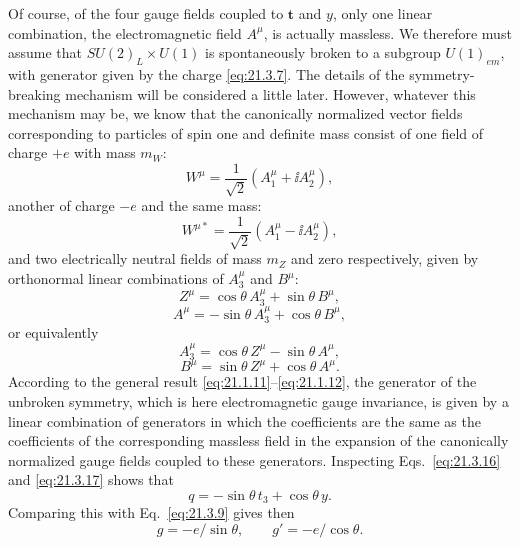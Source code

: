 Of course, of the four gauge fields coupled to $\mathbf{t}$ and $y$, only one linear combination, the electromagnetic field $A^\mu$, is actually massless. We therefore must assume that $SU(2)_L\times U(1)$ is spontaneously broken to a subgroup $U(1)_{em}$, with generator given by the charge \eqref{eq:21.3.7}. The details of the symmetry-breaking mechanism will be considered a little later. However, whatever this mechanism may be, we know that the canonically normalized vector fields corresponding to particles of spin one and definite mass consist of one field of charge $+e$ with mass $m_W$:
\begin{equation}
W^\mu=\frac{1}{\sqrt{2}}\left(A_1^\mu+\ii A_2^\mu\right),
\tag{21.3.12}\label{eq:21.3.12}
\end{equation}
another of charge $-e$ and the same mass:
\begin{equation}
W^{\mu *}=\frac{1}{\sqrt{2}}\left(A_1^\mu-\ii A_2^\mu\right),
\tag{21.3.13}\label{eq:21.3.13}
\end{equation}
and two electrically neutral fields of mass $m_Z$ and zero respectively, given by orthonormal linear combinations of $A_3^\mu$ and $B^\mu$:
\begin{equation}
Z^\mu=\cos\theta\,A_3^\mu+\sin\theta\,B^\mu,
\tag{21.3.14}\label{eq:21.3.14}
\end{equation}
\begin{equation}
A^\mu=-\sin\theta\,A_3^\mu+\cos\theta\,B^\mu,
\tag{21.3.15}\label{eq:21.3.15}
\end{equation}
or equivalently
\begin{equation}
A_3^\mu=\cos\theta\,Z^\mu-\sin\theta\,A^\mu,
\tag{21.3.16}\label{eq:21.3.16}
\end{equation}
\begin{equation}
B^\mu=\sin\theta\,Z^\mu+\cos\theta\,A^\mu.
\tag{21.3.17}\label{eq:21.3.17}
\end{equation}
According to the general result \eqref{eq:21.1.11}--\eqref{eq:21.1.12}, the generator of the unbroken symmetry, which is here electromagnetic gauge invariance, is given by a linear combination of generators in which the coefficients are the same as the coefficients of the corresponding massless field in the expansion of the canonically normalized gauge fields coupled to these generators. Inspecting Eqs.~\eqref{eq:21.3.16} and \eqref{eq:21.3.17} shows that
\begin{equation}
q=-\sin\theta\,t_3+\cos\theta\,y.
\tag{21.3.18}\label{eq:21.3.18}
\end{equation}
Comparing this with Eq.~\eqref{eq:21.3.9} gives then
\begin{equation}
g=-e/\sin\theta,
\qquad
g'=-e/\cos\theta.
\tag{21.3.19}\label{eq:21.3.19}
\end{equation}

